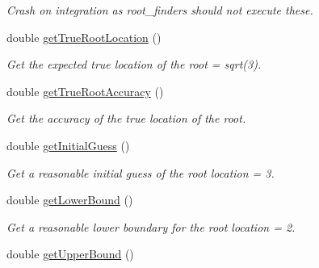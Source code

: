 \begin{DoxyCompactItemize}
\begin{DoxyCompactList}\small\item\em Crash on integration as root\+\_\+finders should not execute these. \end{DoxyCompactList}\item 
double \hyperlink{structtudat_1_1unit__tests_1_1TestFunction2_a74d93c56da84446dbb75768b681f1ace}{get\+True\+Root\+Location} ()\hypertarget{structtudat_1_1unit__tests_1_1TestFunction2_a74d93c56da84446dbb75768b681f1ace}{}\label{structtudat_1_1unit__tests_1_1TestFunction2_a74d93c56da84446dbb75768b681f1ace}

\begin{DoxyCompactList}\small\item\em Get the expected true location of the root = sqrt(3). \end{DoxyCompactList}\item 
double \hyperlink{structtudat_1_1unit__tests_1_1TestFunction2_a5c3919fbb0e5030d6d33ea49cdf68d02}{get\+True\+Root\+Accuracy} ()\hypertarget{structtudat_1_1unit__tests_1_1TestFunction2_a5c3919fbb0e5030d6d33ea49cdf68d02}{}\label{structtudat_1_1unit__tests_1_1TestFunction2_a5c3919fbb0e5030d6d33ea49cdf68d02}

\begin{DoxyCompactList}\small\item\em Get the accuracy of the true location of the root. \end{DoxyCompactList}\item 
double \hyperlink{structtudat_1_1unit__tests_1_1TestFunction2_a04b4e79ea3e2518daf3525244dfdb724}{get\+Initial\+Guess} ()\hypertarget{structtudat_1_1unit__tests_1_1TestFunction2_a04b4e79ea3e2518daf3525244dfdb724}{}\label{structtudat_1_1unit__tests_1_1TestFunction2_a04b4e79ea3e2518daf3525244dfdb724}

\begin{DoxyCompactList}\small\item\em Get a reasonable initial guess of the root location = 3. \end{DoxyCompactList}\item 
double \hyperlink{structtudat_1_1unit__tests_1_1TestFunction2_a69bdb49aeaed99b6ee8ab975c597bec8}{get\+Lower\+Bound} ()\hypertarget{structtudat_1_1unit__tests_1_1TestFunction2_a69bdb49aeaed99b6ee8ab975c597bec8}{}\label{structtudat_1_1unit__tests_1_1TestFunction2_a69bdb49aeaed99b6ee8ab975c597bec8}

\begin{DoxyCompactList}\small\item\em Get a reasonable lower boundary for the root location = 2. \end{DoxyCompactList}\item 
double \hyperlink{structtudat_1_1unit__tests_1_1TestFunction2_ad43df0e31a82c2d79ceec5b1b180146e}{get\+Upper\+Bound} ()\hypertarget{structtudat_1_1unit__tests_1_1TestFunction2_ad43df0e31a82c2d79ceec5b1b180146e}{}\label{structtudat_1_1unit__tests_1_1TestFunction2_ad43df0e31a82c2d79ceec5b1b180146e}


\end{DoxyCompactItemize}
